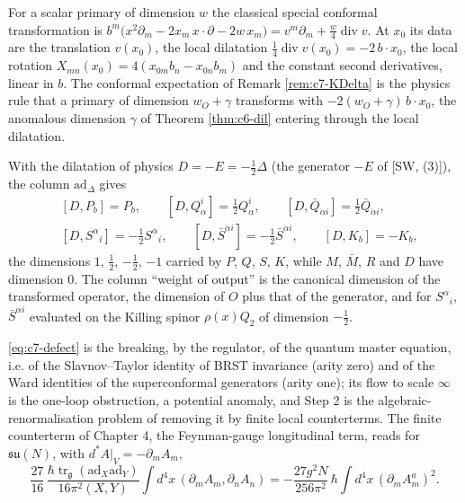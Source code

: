 \begin{remark}
For a scalar primary of dimension $w$ the classical special conformal transformation is $b^m\big(x^2\partial_m-2x_m\,x\cdot\partial-2w\,x_m\big)=v^m\partial_m+\tfrac w4\operatorname{div}v$. At $x_0$ its data are the translation $v(x_0)$, the local dilatation $\tfrac14\operatorname{div}v(x_0)=-2\,b\cdot x_0$, the local rotation $X_{mn}(x_0)=4(x_{0m}b_n-x_{0n}b_m)$ and the constant second derivatives, linear in $b$. The conformal expectation of Remark \ref{rem:c7-KDelta} is the physics rule that a primary of dimension $w_O+\gamma$ transforms with $-2(w_O+\gamma)\,b\cdot x_0$, the anomalous dimension $\gamma$ of Theorem \ref{thm:c6-dil} entering through the local dilatation.
\end{remark}

\begin{remark}
With the dilatation of physics $D=-E=-\tfrac12\Delta$ (the generator $-E$ of [SW, (3)]), the column $\mathrm{ad}_\Delta$ gives
\[
\begin{aligned}&[D,P_b]=P_b,\qquad [D,Q^i_\alpha]=\tfrac12Q^i_\alpha,\qquad [D,\bar Q_{\dot\alpha i}]=\tfrac12\bar Q_{\dot\alpha i},\\ &[D,S^\alpha{}_i]=-\tfrac12S^\alpha{}_i,\qquad [D,\bar S^{\dot\alpha i}]=-\tfrac12\bar S^{\dot\alpha i},\qquad [D,K_b]=-K_b,\end{aligned}
\]
the dimensions $1$, $\tfrac12$, $-\tfrac12$, $-1$ carried by $P$, $Q$, $S$, $K$, while $M$, $\bar M$, $R$ and $D$ have dimension $0$. The column ``weight of output'' is the canonical dimension of the transformed operator, the dimension of $O$ plus that of the generator, and for $S^\alpha{}_i$, $\bar S^{\dot\alpha i}$ evaluated on the Killing spinor $\rho(x)Q_2$ of dimension $-\tfrac12$.
\end{remark}

\begin{remark}
\eqref{eq:c7-defect} is the breaking, by the regulator, of the quantum master equation, i.e. of the Slavnov--Taylor identity of BRST invariance (arity zero) and of the Ward identities of the superconformal generators (arity one); its flow to scale $\infty$ is the one-loop obstruction, a potential anomaly, and Step 2 is the algebraic-renormalisation problem of removing it by finite local counterterms. The finite counterterm of Chapter 4, the Feynman-gauge longitudinal term, reads for $\mathfrak{su}(N)$, with $d^*A|_V=-\partial_mA_m$,
\[
\frac{27}{16}\,\frac{\hbar\operatorname{tr}_{\mathfrak g}(\mathrm{ad}_X\mathrm{ad}_Y)}{16\pi^2(X,Y)}\int d^4x\,(\partial_mA_m,\partial_nA_n)=-\frac{27g^2N}{256\pi^2}\,\hbar\int d^4x\,(\partial_mA^a_m)^2 .
\]
\end{remark}

